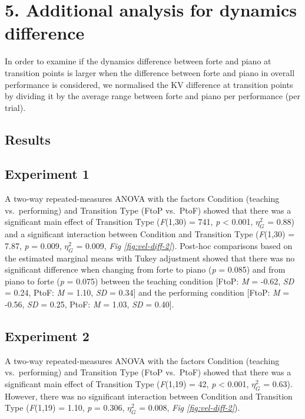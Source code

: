 \documentclass[
  man,floatsintext]{apa6}
\begin{document}
\clearpage

\hypertarget{additional-analysis-for-dynamics-difference}{%
\section{5. Additional analysis for dynamics difference}\label{additional-analysis-for-dynamics-difference}}

In order to examine if the dynamics difference between forte and piano at transition points is larger when the difference between forte and piano in overall performance is considered, we normalised the KV difference at transition points by dividing it by the average range between forte and piano per performance (per trial).

\hypertarget{results-4}{%
\subsection{Results}\label{results-4}}

\hypertarget{experiment-1-5}{%
\subsection{Experiment 1}\label{experiment-1-5}}

A two-way repeated-measures ANOVA with the factors Condition (teaching vs.~performing) and Transition Type (FtoP vs.~PtoF) showed that there was a significant main effect of Transition Type (\emph{F}(1,30) = 741, \emph{p} \textless{} 0.001, \(\eta_G^2\) = 0.88) and a significant interaction between Condition and Transition Type (\emph{F}(1,30) = 7.87, \emph{p} = 0.009, \(\eta_G^2\) = 0.009, \emph{Fig \ref{fig:vel-diff-2}}). Post-hoc comparisons based on the estimated marginal means with Tukey adjustment showed that there was no significant difference when changing from forte to piano (\emph{p} = 0.085) and from piano to forte (\emph{p} = 0.075) between the teaching condition {[}FtoP: \emph{M} = -0.62, \emph{SD} = 0.24, PtoF: \emph{M} = 1.10, \emph{SD} = 0.34{]} and the performing condition {[}FtoP: \emph{M} = -0.56, \emph{SD} = 0.25, PtoF: \emph{M} = 1.03, \emph{SD} = 0.40{]}.

\hypertarget{experiment-2-5}{%
\subsection{Experiment 2}\label{experiment-2-5}}

A two-way repeated-measures ANOVA with the factors Condition (teaching vs.~performing) and Transition Type (FtoP vs.~PtoF) showed that there was a significant main effect of Transition Type (\emph{F}(1,19) = 42, \emph{p} \textless{} 0.001, \(\eta_G^2\) = 0.63). However, there was no significant interaction between Condition and Transition Type (\emph{F}(1,19) = 1.10, \emph{p} = 0.306, \(\eta_G^2\) = 0.008, \emph{Fig \ref{fig:vel-diff-2}}).
\end{document}
